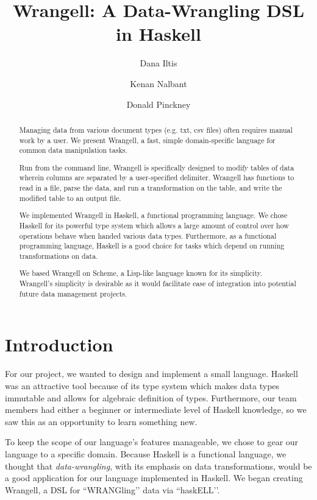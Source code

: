 \documentclass[preprint,nocopyrightspace]{sig-alternate}
\begin{document}
%

\title{Wrangell: A Data-Wrangling DSL in Haskell}

\author{Dana Iltis}
\author{Kenan Nalbant}
\author{Donald Pinckney}


\maketitle

\begin{abstract}
Managing data from various document types (e.g. txt, csv files) often requires manual work by a user. We present Wrangell, a fast, simple domain-specific language for common data manipulation tasks.

Run from the command line, Wrangell is specifically designed to modify tables of data wherein columns are separated by a user-specified delimiter. Wrangell has functions to read in a file, parse the data, and run a transformation on the table, and write the modified table to an output file. 

We implemented Wrangell in Haskell, a functional programming language. We chose Haskell for its powerful type system which allows a large amount of control over how operations behave when handed various data types. Furthermore, as a functional programming language, Haskell is a good choice for tasks which depend on running transformations on data.

We based Wrangell on Scheme, a Lisp-like language known for its simplicity. Wrangell’s simplicity is desirable as it would facilitate ease of integration into potential future data management projects.


\end{abstract}

\section{Introduction}
For our project, we wanted to design and implement a small language. Haskell was an attractive tool because of its type system which makes data types immutable and allows for algebraic definition of types. Furthermore, our team members had either a beginner or intermediate level of Haskell knowledge, so we saw this as an opportunity to learn something new. 

To keep the scope of our language’s features manageable, we chose to gear our language to a specific domain. Because Haskell is a functional language, we thought that \emph{data-wrangling}, with its emphasis on data transformations, would be a good application for our language implemented in Haskell. We began creating Wrangell, a DSL for ``WRANGling’’ data via ``haskELL’’.  
\end{document}
